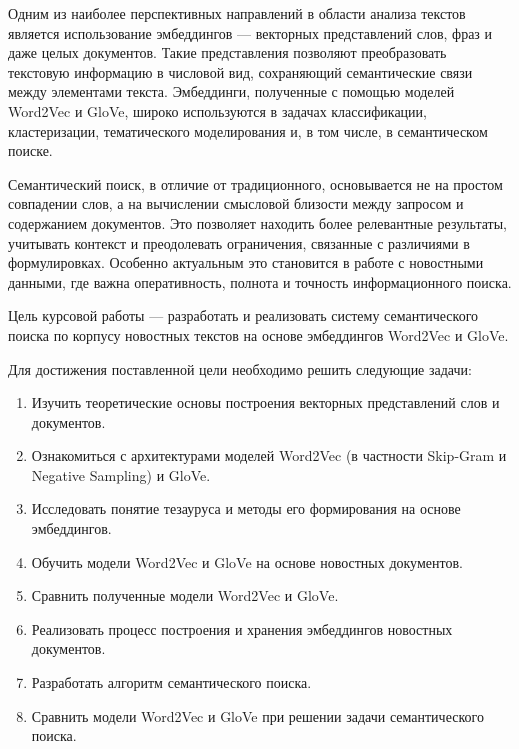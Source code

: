 \documentclass[coursework]{SCWorks}
\begin{document}
Одним из наиболее перспективных направлений в области анализа текстов является использование эмбеддингов — векторных представлений слов, фраз и даже целых документов. Такие представления позволяют преобразовать текстовую информацию в числовой вид, сохраняющий семантические связи между элементами текста. Эмбеддинги, полученные с помощью моделей Word2Vec и GloVe, широко используются в задачах классификации, кластеризации, тематического моделирования и, в том числе, в семантическом поиске.

Семантический поиск, в отличие от традиционного, основывается не на простом совпадении слов, а на вычислении смысловой близости между запросом и содержанием документов. Это позволяет находить более релевантные результаты, учитывать контекст и преодолевать ограничения, связанные с различиями в формулировках. Особенно актуальным это становится в работе с новостными данными, где важна оперативность, полнота и точность информационного поиска.

Цель курсовой работы — разработать и реализовать систему семантического поиска по корпусу новостных текстов на основе эмбеддингов Word2Vec и GloVe.

Для достижения поставленной цели необходимо решить следующие задачи:
\begin{enumerate}
    \item Изучить теоретические основы построения векторных представлений слов и документов.

    \item Ознакомиться с архитектурами моделей Word2Vec (в частности Skip-Gram и Negative Sampling) и GloVe.

    \item Исследовать понятие тезауруса и методы его формирования на основе эмбеддингов.
    
    \item Обучить модели Word2Vec и GloVe на основе новостных документов.
    
    \item Сравнить полученные модели Word2Vec и GloVe.

    \item Реализовать процесс построения и хранения эмбеддингов новостных документов.

    \item Разработать алгоритм семантического поиска.

    \item Сравнить модели Word2Vec и GloVe при решении задачи семантического поиска.
\end{enumerate}
\end{document}
